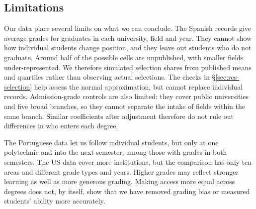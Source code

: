 \subsection{Limitations}
\label{sec:res-limitations}

Our data place several limits on what we can conclude. The Spanish records give average grades for graduates in each university, field and year. They cannot show how individual students change position, and they leave out students who do not graduate. Around half of the possible cells are unpublished, with smaller fields under-represented. We therefore simulated selection shares from published means and quartiles rather than observing actual selections. The checks in \S\ref{sec:res-selection} help assess the normal approximation, but cannot replace individual records. Admission-grade controls are also limited: they cover public universities and five broad branches, so they cannot separate the intake of fields within the same branch. Similar coefficients after adjustment therefore do not rule out differences in who enters each degree.

The Portuguese data let us follow individual students, but only at one polytechnic and into the next semester, among those with grades in both semesters. The US data cover more institutions, but the comparison has only ten areas and different grade types and years. Higher grades may reflect stronger learning as well as more generous grading. Making access more equal across degrees does not, by itself, show that we have removed grading bias or measured students' ability more accurately.
